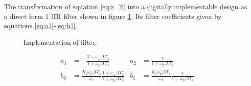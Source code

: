 		The transformation of equation \ref{eq:z_lf} into a digitally implementable design as a direct form 1 IIR filter shown in figure \ref{fig:filt_imple}. Its filter coefficients given by equations \ref{eq:a1}-\ref{eq:b1}.
		\begin{figure}[htb!]
			\center
			\caption{Implementation of filter.}
			\label{fig:filt_imple}
		\end{figure}
		\begin{align}
			a_1 &= -\frac{2+\omega_p\Delta T_s}{1+\omega_p\Delta T_s}\label{eq:a1} 
			& a_2 &= \frac{1}{1+\omega_p\Delta T_s} \\
			b_0 &= \frac{K_i\omega_p\Delta T_s}{\omega_z}\frac{1+\omega_z\Delta T_s}{1+\omega_p\Delta T_s}
			& b_1 &= \frac{K_i\omega_p\Delta T_s}{\omega_z}\frac{1}{1+\omega_p\Delta T_s}\label{eq:b1}
		\end{align}


